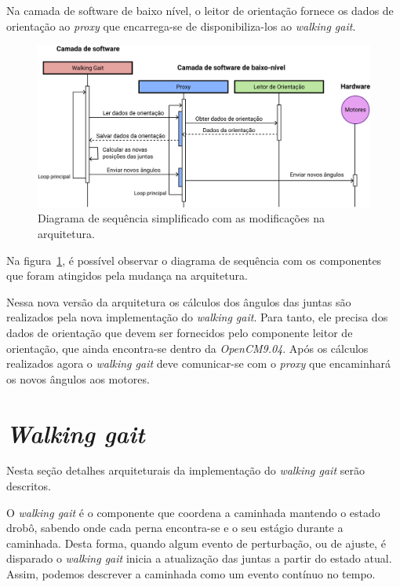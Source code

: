 Na camada de software de baixo nível, o leitor de orientação fornece os dados de orientação ao \textit{proxy} que encarrega-se de disponibiliza-los ao \textit{walking gait}.

\begin{figure}[h!]
	\centering
	\includegraphics[scale=1]{imagens/svg/softwarearchitecture-newproposal-sequence}
	\caption{Diagrama de sequência simplificado com as modificações na arquitetura.}
	\label{fig:softwarearchitecture:newproposal:sequence}
\end{figure}

Na figura~\ref{fig:softwarearchitecture:newproposal:sequence}, é possível observar o diagrama de sequência com os componentes que foram atingidos pela mudança na arquitetura.

Nessa nova versão da arquitetura os cálculos dos ângulos das juntas são realizados pela nova implementação do \textit{walking gait}. Para tanto, ele precisa dos dados de orientação que devem ser fornecidos pelo componente leitor de orientação, que ainda encontra-se dentro da \textit{OpenCM9.04}. Após os cálculos realizados agora o \textit{walking gait} deve comunicar-se com o \textit{proxy} que encaminhará os novos ângulos aos motores.

\section{\textit{Walking gait}}

Nesta seção detalhes arquiteturais da implementação do \textit{walking gait} serão descritos.

O \textit{walking gait} é o componente que coordena a caminhada mantendo o estado drobô, sabendo onde cada perna encontra-se e o seu estágio durante a caminhada. Desta forma, quando algum evento de perturbação, ou de ajuste, é disparado o \textit{walking gait} inicia a atualização das juntas a partir do estado atual. Assim, podemos descrever a caminhada como um evento contínuo no tempo.

